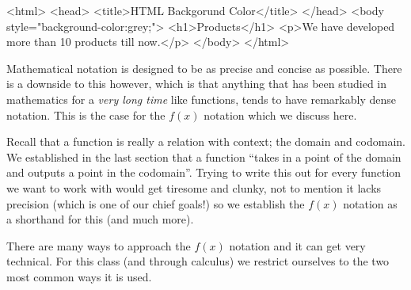 \documentclass{ximera}
\begin{document}


<html>
   <head>
      <title>HTML Backgorund Color</title>
   </head>
   <body style="background-color:grey;">
      <h1>Products</h1>
      <p>We have developed more than 10 products till now.</p>
   </body>
</html>



    Mathematical notation is designed to be as precise and concise as possible. There is a downside to this however, which is that anything that has been studied in mathematics for a \textit{very long time} like functions, tends to have remarkably dense notation. This is the case for the $f(x)$ notation which we discuss here.
    
    Recall that a function is really a relation with context; the domain and codomain. We established in the last section that a function ``takes in a point of the domain and outputs a point in the codomain''. Trying to write this out for every function we want to work with would get tiresome and clunky, not to mention it lacks precision (which is one of our chief goals!) so we establish the $f(x)$ notation as a shorthand for this (and much more).
    
    There are many ways to approach the $f(x)$ notation and it can get very technical. For this class (and through calculus) we restrict ourselves to the two most common ways it is used.
    
\end{document}
